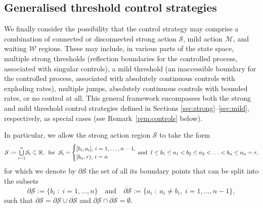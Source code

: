 \documentclass[11pt]{article} %
\numberwithin{komcounter}{section}
\renewcommand{\ul}{\underline}
\newcommand{\ol}{\overline}
\begin{document}
 
\subsection{Generalised threshold control strategies}
\label{sec:general}

We finally consider the possibility that the control strategy may comprise a combination of connected or disconnected strong action $\mathcal{S}$, mild action $\mathcal{M}$, and waiting $\mathcal{W}$ regions. 
These may include, in various parts of the state space, multiple strong thresholds (reflection boundaries for the controlled process, associated with singular controls), a mild threshold (an inaccessible boundary for the controlled process, associated with absolutely continuous controls with exploding rates), multiple jumps, absolutely continuous controls with bounded rates, or no control at all. This general framework encompasses both the strong and mild threshold control strategies defined in Sections \ref{sec:strong}--\ref{sec:mild}, respectively, as special cases (see Remark~\ref{rem:controls} below).

In particular, we allow the strong action region $\mathcal{S}$ to take the form
\begin{align} \label{S}
\begin{split}
\mathcal{S} := %
{\textstyle \bigcup\limits_{i=1}^n} \mathcal{S}_i \subseteq \mathbb{R}, 
\, \text{ for } \; 
\mathcal{S}_i = \begin{cases}
[b_i, a_i], \, i = 1, \ldots, n-1, \\
[b_{n}, r), \, i = n
\end{cases}
\hspace{-3mm}\text{and } \; 
l \leq b_1 \leq a_1 < b_2 \leq a_2 < \ldots < b_{n} \leq a_{n}=r,
\end{split}
\end{align}
for which we denote by $\partial \mathcal{S}$ the set of all its boundary points that can be split into the subsets 
\begin{equation} \label{DefdP}
\ul{\partial \mathcal{S}} := \{b_i \;:\; i=1,\ldots,n\} 
\quad \text{and} \quad 
\ol{\partial \mathcal{S}} := \{ a_i \;:\; a_i\neq b_i, \; i = 1,\ldots, n-1\},
\end{equation}
such that ${\partial \mathcal{S}} = \ul{\partial \mathcal{S}} \cup \ol{\partial \mathcal{S}}$ and $\ul{\partial \mathcal{S}} \cap \ol{\partial \mathcal{S}} = \emptyset$. 
\end{document}
